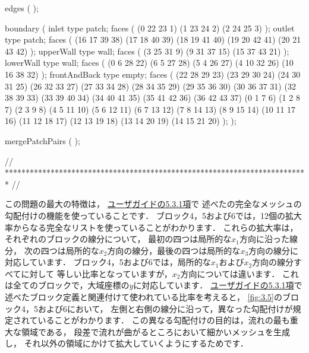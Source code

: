 \begin{OFverbatim}
edges
(
);

boundary
(
    inlet
    {
        type patch;
        faces
        (
            (0 22 23 1)
            (1 23 24 2)
            (2 24 25 3)
        );
    }
    outlet
    {
        type patch;
        faces
        (
            (16 17 39 38)
            (17 18 40 39)
            (18 19 41 40)
            (19 20 42 41)
            (20 21 43 42)
        );
    }
    upperWall
    {
        type wall;
        faces
        (
            (3 25 31 9)
            (9 31 37 15)
            (15 37 43 21)
        );
    }
    lowerWall
    {
        type wall;
        faces
        (
            (0 6 28 22)
            (6 5 27 28)
            (5 4 26 27)
            (4 10 32 26)
            (10 16 38 32)
        );
    }
    frontAndBack
    {
        type empty;
        faces
        (
            (22 28 29 23)
            (23 29 30 24)
            (24 30 31 25)
            (26 32 33 27)
            (27 33 34 28)
            (28 34 35 29)
            (29 35 36 30)
            (30 36 37 31)
            (32 38 39 33)
            (33 39 40 34)
            (34 40 41 35)
            (35 41 42 36)
            (36 42 43 37)
            (0 1 7 6)
            (1 2 8 7)
            (2 3 9 8)
            (4 5 11 10)
            (5 6 12 11)
            (6 7 13 12)
            (7 8 14 13)
            (8 9 15 14)
            (10 11 17 16)
            (11 12 18 17)
            (12 13 19 18)
            (13 14 20 19)
            (14 15 21 20)
        );
    }
);

mergePatchPairs
(
);

// ************************************************************************* //
\end{OFverbatim}
この問題の最大の特徴は，
\href{UserGuideJa.pdf#subsection.5.3.1}{ユーザガイドの5.3.1項}で
述べたの完全なメッシュの勾配付けの機能を使っていることです．
ブロック4，5および6では，12個の拡大率からなる完全なリストを使っていることがわかります．
これらの拡大率は，それぞれのブロックの線分について，
最初の四つは局所的な$x_{1}$方向に沿った線分，
次の四つは局所的な$x_{2}$方向の線分，最後の四つは局所的な$x_{3}$方向の線分に対応しています．
ブロック4，5および6では，局所的な$x_{1}$および$x_{2}$方向の線分すべてに対して
等しい比率となっていますが，$x_{2}$方向については違います．
これは全てのブロックで，大域座標の$y$に対応しています．
\href{UserGuideJa.pdf#subsection.5.3.1}{ユーザガイドの5.3.1項}で
述べたブロック定義と関連付けて使われている比率を考えると，
\autoref{fig:3.5}のブロック4，5および6において，
左側と右側の線分に沿って，異なった勾配付けが規定されていることがわかります．
この異なる勾配付けの目的は，流れの最も重大な領域である，
段差で流れが曲がるところにおいて細かいメッシュを生成し，
それ以外の領域にかけて拡大していくようにするためです．

